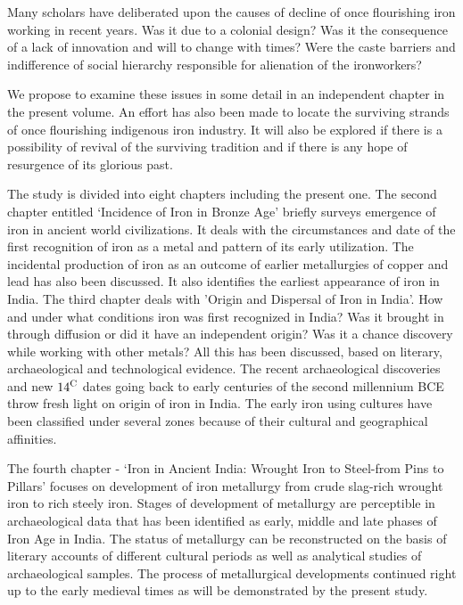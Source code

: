 Many scholars have deliberated upon the causes of decline of once flourishing iron working in recent years. Was it due to a colonial design? Was it the consequence of a lack of innovation and will to change with times? Were the caste barriers and indifference of social hierarchy responsible for alienation of the ironworkers?

We propose to examine these issues in some detail in an independent chapter in the present volume. An effort has also been made to locate the surviving strands of once flourishing indigenous iron industry. It will also be explored if there is a possibility of revival of the surviving tradition and if there is any hope of resurgence of its glorious past.

The study is divided into eight chapters including the present one. The second chapter entitled `Incidence of Iron in Bronze Age' briefly surveys emergence of iron in ancient world civilizations. It deals with the circumstances and date of the first recognition of iron as a metal and pattern of its early utilization. The incidental production of iron as an outcome of earlier metallurgies of copper and lead has also been discussed. It also identifies the earliest appearance of iron in India. The third chapter deals with 'Origin and Dispersal of Iron in India'. How and under what conditions iron was first recognized in India? Was it brought in through diffusion or did it have an independent origin? Was it a chance discovery while working with other metals? All this has been discussed, based on literary, archaeological and technological evidence. The recent archaeological discoveries and new ${14}^{\rm C}$ dates going back to early centuries of the second millennium BCE throw fresh light on origin of iron in India. The early iron using cultures have been classified under several zones because of their cultural and geographical affinities.

The fourth chapter - ‘Iron in Ancient India: Wrought Iron to Steel-from Pins to Pillars’ focuses on development of iron metallurgy from crude slag-rich wrought iron to rich steely iron. Stages of development of metallurgy are perceptible in archaeological data that has been identified as early, middle and late phases of Iron Age in India. The status of metallurgy can be reconstructed on the basis of literary accounts of different cultural periods as well as analytical studies of archaeological samples. The process of metallurgical developments continued right up to the early medieval times as will be demonstrated by the present study.




